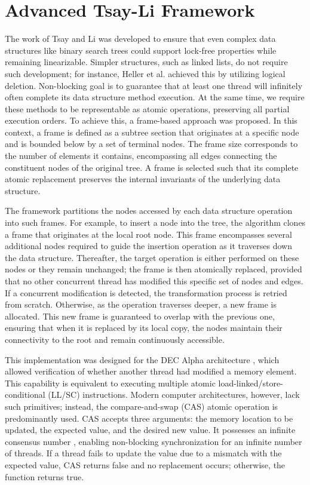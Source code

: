 \section{Advanced Tsay-Li Framework}
\label{sec:advanced_tsay_li_framework}

The work of Tsay and Li \cite{TsayLi} was developed to ensure that even complex data structures like binary search trees could support lock-free properties while remaining linearizable. Simpler structures, such as linked lists, do not require such development; for instance, Heller et al. \cite{LockFreeList} achieved this by utilizing logical deletion. Non-blocking goal is to guarantee that at least one thread will infinitely often complete its data structure method execution. At the same time, we require these methods to be representable as atomic operations, preserving all partial execution orders. To achieve this, a frame-based approach was proposed. In this context, a frame is defined as a subtree section that originates at a specific node and is bounded below by a set of terminal nodes. The frame size corresponds to the number of elements it contains, encompassing all edges connecting the constituent nodes of the original tree. A frame is selected such that its complete atomic replacement preserves the internal invariants of the underlying data structure.



The framework partitions the nodes accessed by each data structure operation into such frames. For example, to insert a node into the tree, the algorithm clones a frame that originates at the local root node. This frame encompasses several additional nodes required to guide the insertion operation as it traverses down the data structure. Thereafter, the target operation is either performed on these nodes or they remain unchanged; the frame is then atomically replaced, provided that no other concurrent thread has modified this specific set of nodes and edges. If a concurrent modification is detected, the transformation process is retried from scratch. Otherwise, as the operation traverses deeper, a new frame is allocated. This new frame is guaranteed to overlap with the previous one, ensuring that when it is replaced by its local copy, the nodes maintain their connectivity to the root and remain continuously accessible.

This implementation was designed for the DEC Alpha architecture \cite{SitesDECAlpha}, which allowed verification of whether another thread had modified a memory element. This capability is equivalent to executing multiple atomic load-linked/store-conditional (LL/SC) instructions. Modern computer architectures, however, lack such primitives; instead, the compare-and-swap (CAS) atomic operation is predominantly used. CAS accepts three arguments: the memory location to be updated, the expected value, and the desired new value. It possesses an infinite consensus number \cite{WaitFreeSync}, enabling non-blocking synchronization for an infinite number of threads. If a thread fails to update the value due to a mismatch with the expected value, CAS returns false and no replacement occurs; otherwise, the function returns true.

